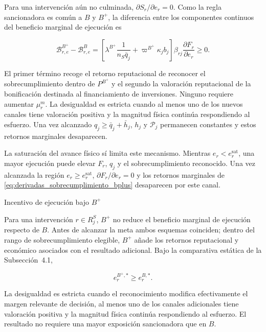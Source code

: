 Para una intervención aún no culminada, \(\partial S_r/\partial e_r=0\). Como la regla sancionadora es común a \(B\) y \(B^{+}\), la diferencia entre los componentes continuos del beneficio marginal de ejecución es

\begin{equation}
\label{eq:incentivo_marginal_bplus}
\mathcal B_{r,e}^{B^{+}}
-
\mathcal B_{r,e}^{B}
=
\left[
\lambda^{B^{+}}
\frac{1}{n_S\bar q_j}
+
\varpi^{B^{+}}
\kappa_j b_j
\right]
\beta_{rj}
\frac{\partial F_r}{\partial e_r}
\geq
0.
\end{equation}

El primer término recoge el retorno reputacional de reconocer el sobrecumplimiento dentro de \(P^{B^{+}}\) y el segundo la valoración reputacional de la bonificación destinada al financiamiento de inversiones. Ninguno requiere aumentar \(\mu_r^m\). La desigualdad es estricta cuando al menos uno de los nuevos canales tiene valoración positiva y la magnitud física continúa respondiendo al esfuerzo. Una vez alcanzado \(q_j\geq\bar q_j+\bar h_j\), \(h_j\) y \(\mathcal P_j\) permanecen constantes y estos retornos marginales desaparecen.

La saturación del avance físico sí limita este mecanismo. Mientras \(e_r<e_r^{\mathrm{sat}}\), una mayor ejecución puede elevar \(F_r\), \(q_j\) y el sobrecumplimiento reconocido. Una vez alcanzada la región \(e_r\geq e_r^{\mathrm{sat}}\), \(\partial F_r/\partial e_r=0\) y los retornos marginales de \eqref{eq:derivadas_sobrecumplimiento_bplus} desaparecen por este canal.

\begin{resultadobox}
{Incentivo de ejecución bajo \(B^{+}\)}
\label{res:incentivo_ejecucion_bplus}

Para una intervención \(r\in R_j^{S}\), \(B^{+}\) no reduce el beneficio marginal de ejecución respecto de \(B\). Antes de alcanzar la meta ambos esquemas coinciden; dentro del rango de sobrecumplimiento elegible, \(B^{+}\) añade los retornos reputacional y económico asociados con el resultado adicional. Bajo la comparativa estática de la Subsección~4.1,

\begin{equation}
e_r^{B^{+},*}
\geq
e_r^{B,*}.
\end{equation}

La desigualdad es estricta cuando el reconocimiento modifica efectivamente el margen relevante de decisión, al menos uno de los canales adicionales tiene valoración positiva y la magnitud física continúa respondiendo al esfuerzo. El resultado no requiere una mayor exposición sancionadora que en \(B\).
\end{resultadobox}

